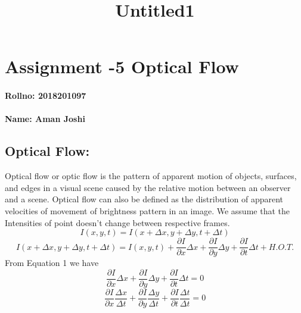 \documentclass[11pt]{article}
\title{Untitled1}
\begin{document}
    
    
    \maketitle
    
    

    
    \hypertarget{assignment--5-optical-flow}{%
\section{\texorpdfstring{Assignment -5 \textbf{Optical
Flow}}{Assignment -5 Optical Flow}}\label{assignment--5-optical-flow}}

\hypertarget{rollno-2018201097}{%
\paragraph{Rollno: 2018201097}\label{rollno-2018201097}}

\hypertarget{name-aman-joshi}{%
\paragraph{Name: Aman Joshi}\label{name-aman-joshi}}

    \hypertarget{optical-flow}{%
\subsection{Optical Flow:}\label{optical-flow}}

Optical flow or optic flow is the pattern of apparent motion of objects,
surfaces, and edges in a visual scene caused by the relative motion
between an observer and a scene. Optical flow can also be defined as the
distribution of apparent velocities of movement of brightness pattern in
an image. We assume that the Intensities of point doesn't change between
respective frames. \begin{equation*}
I(x,y,t) = I(x+\Delta x, y + \Delta y, t + \Delta t)
\end{equation*} \begin{equation}
I(x+\Delta x,y+\Delta y,t+\Delta t) = I(x,y,t) + \frac{\partial I}{\partial x}\Delta x+\frac{\partial I}{\partial y}\Delta y+\frac{\partial I}{\partial t}\Delta t+H.O.T.
\end{equation} From Equation 1 we have \begin{equation*}
\frac{\partial I}{\partial x}\Delta x+\frac{\partial I}{\partial y}\Delta y+\frac{\partial I}{\partial t}\Delta t = 0
\end{equation*} \begin{equation*}
\frac{\partial I}{\partial x}\frac{\Delta x}{\Delta t}+\frac{\partial I}{\partial y}\frac{\Delta y}{\Delta t}+\frac{\partial I}{\partial t}\frac{\Delta t}{\Delta t} = 0
\end{equation*}
\end{document}
